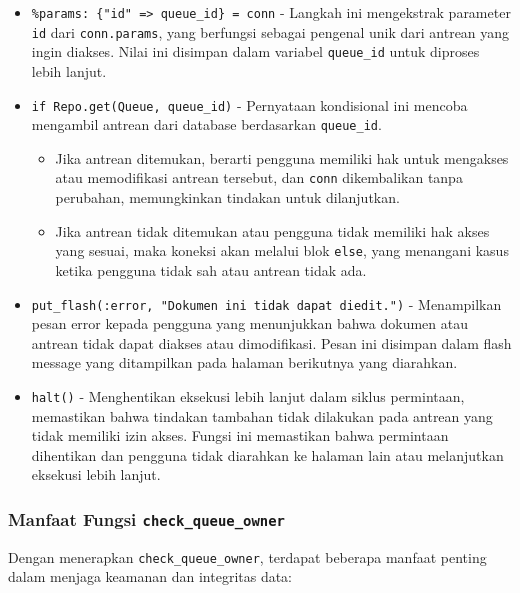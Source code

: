 \begin{itemize}
	\item \texttt{\%{params: \{"id" => queue\_id\}} = conn} - Langkah ini mengekstrak parameter \texttt{id} dari \texttt{conn.params}, yang berfungsi sebagai pengenal unik dari antrean yang ingin diakses. Nilai ini disimpan dalam variabel \texttt{queue\_id} untuk diproses lebih lanjut.
	
	\item \texttt{if Repo.get(Queue, queue\_id)} - Pernyataan kondisional ini mencoba mengambil antrean dari database berdasarkan \texttt{queue\_id}. 
	\begin{itemize}
		\item Jika antrean ditemukan, berarti pengguna memiliki hak untuk mengakses atau memodifikasi antrean tersebut, dan \texttt{conn} dikembalikan tanpa perubahan, memungkinkan tindakan untuk dilanjutkan.
		\item Jika antrean tidak ditemukan atau pengguna tidak memiliki hak akses yang sesuai, maka koneksi akan melalui blok \texttt{else}, yang menangani kasus ketika pengguna tidak sah atau antrean tidak ada.
	\end{itemize}
	
	\item \texttt{put\_flash(:error, "Dokumen ini tidak dapat diedit.")} - Menampilkan pesan error kepada pengguna yang menunjukkan bahwa dokumen atau antrean tidak dapat diakses atau dimodifikasi. Pesan ini disimpan dalam flash message yang ditampilkan pada halaman berikutnya yang diarahkan.
	
	\item \texttt{halt()} - Menghentikan eksekusi lebih lanjut dalam siklus permintaan, memastikan bahwa tindakan tambahan tidak dilakukan pada antrean yang tidak memiliki izin akses. Fungsi ini memastikan bahwa permintaan dihentikan dan pengguna tidak diarahkan ke halaman lain atau melanjutkan eksekusi lebih lanjut.
\end{itemize}

\subsubsection{Manfaat Fungsi \texttt{check\_queue\_owner}}
Dengan menerapkan \texttt{check\_queue\_owner}, terdapat beberapa manfaat penting dalam menjaga keamanan dan integritas data:

